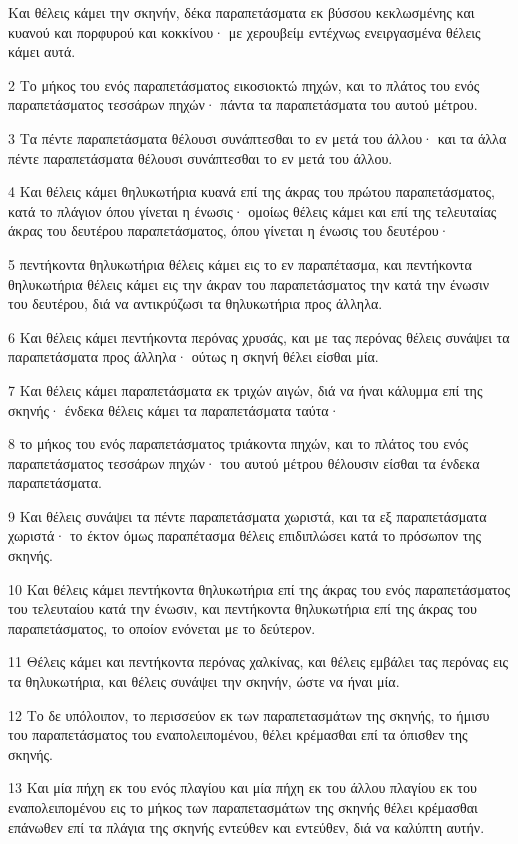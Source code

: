 \par Και θέλεις κάμει την σκηνήν, δέκα παραπετάσματα εκ βύσσου κεκλωσμένης και κυανού και πορφυρού και κοκκίνου· με χερουβείμ εντέχνως ενειργασμένα θέλεις κάμει αυτά.
\par 2 Το μήκος του ενός παραπετάσματος εικοσιοκτώ πηχών, και το πλάτος του ενός παραπετάσματος τεσσάρων πηχών· πάντα τα παραπετάσματα του αυτού μέτρου.
\par 3 Τα πέντε παραπετάσματα θέλουσι συνάπτεσθαι το εν μετά του άλλου· και τα άλλα πέντε παραπετάσματα θέλουσι συνάπτεσθαι το εν μετά του άλλου.
\par 4 Και θέλεις κάμει θηλυκωτήρια κυανά επί της άκρας του πρώτου παραπετάσματος, κατά το πλάγιον όπου γίνεται η ένωσις· ομοίως θέλεις κάμει και επί της τελευταίας άκρας του δευτέρου παραπετάσματος, όπου γίνεται η ένωσις του δευτέρου·
\par 5 πεντήκοντα θηλυκωτήρια θέλεις κάμει εις το εν παραπέτασμα, και πεντήκοντα θηλυκωτήρια θέλεις κάμει εις την άκραν του παραπετάσματος την κατά την ένωσιν του δευτέρου, διά να αντικρύζωσι τα θηλυκωτήρια προς άλληλα.
\par 6 Και θέλεις κάμει πεντήκοντα περόνας χρυσάς, και με τας περόνας θέλεις συνάψει τα παραπετάσματα προς άλληλα· ούτως η σκηνή θέλει είσθαι μία.
\par 7 Και θέλεις κάμει παραπετάσματα εκ τριχών αιγών, διά να ήναι κάλυμμα επί της σκηνής· ένδεκα θέλεις κάμει τα παραπετάσματα ταύτα·
\par 8 το μήκος του ενός παραπετάσματος τριάκοντα πηχών, και το πλάτος του ενός παραπετάσματος τεσσάρων πηχών· του αυτού μέτρου θέλουσιν είσθαι τα ένδεκα παραπετάσματα.
\par 9 Και θέλεις συνάψει τα πέντε παραπετάσματα χωριστά, και τα εξ παραπετάσματα χωριστά· το έκτον όμως παραπέτασμα θέλεις επιδιπλώσει κατά το πρόσωπον της σκηνής.
\par 10 Και θέλεις κάμει πεντήκοντα θηλυκωτήρια επί της άκρας του ενός παραπετάσματος του τελευταίου κατά την ένωσιν, και πεντήκοντα θηλυκωτήρια επί της άκρας του παραπετάσματος, το οποίον ενόνεται με το δεύτερον.
\par 11 Θέλεις κάμει και πεντήκοντα περόνας χαλκίνας, και θέλεις εμβάλει τας περόνας εις τα θηλυκωτήρια, και θέλεις συνάψει την σκηνήν, ώστε να ήναι μία.
\par 12 Το δε υπόλοιπον, το περισσεύον εκ των παραπετασμάτων της σκηνής, το ήμισυ του παραπετάσματος του εναπολειπομένου, θέλει κρέμασθαι επί τα όπισθεν της σκηνής.
\par 13 Και μία πήχη εκ του ενός πλαγίου και μία πήχη εκ του άλλου πλαγίου εκ του εναπολειπομένου εις το μήκος των παραπετασμάτων της σκηνής θέλει κρέμασθαι επάνωθεν επί τα πλάγια της σκηνής εντεύθεν και εντεύθεν, διά να καλύπτη αυτήν.

